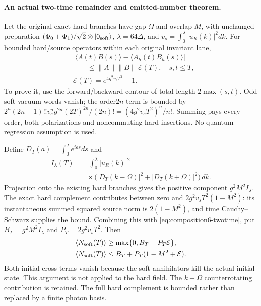 \paragraph{An actual two-time remainder and emitted-number theorem.}
Let the original exact hard branches have gap \(\Omega\) and overlap
\(M\), with unchanged preparation
\((\Phi_0+\Phi_1)/\sqrt2\otimes|0_{\rm soft}\rangle\),
\(\lambda=64\Delta\), and
\(v_s=\int_0^\lambda |u_R(k)|^2dk\).
For bounded hard/source operators within each original invariant lane,
\begin{equation}
 \begin{aligned}
 &|\langle A(t)B(s)\rangle-\langle A_h(t)B_h(s)\rangle|\\
 &\qquad\le\|A\|\|B\|\,\mathcal E(T),\quad s,t\le T,\\
 &\mathcal E(T)=e^{4g^2v_sT^2}-1.
 \end{aligned}
 \label{eq:composition6-twotime}
\end{equation}
To prove it, use the forward/backward contour of total length
\(2\max(s,t)\). Odd soft-vacuum words vanish; the order\(2n\) term is
bounded by \(2^n(2n-1)!!v_s^ng^{2n}(2T)^{2n}/(2n)!
=(4g^2v_sT^2)^n/n!\). Summing pays every order, both polarizations and
noncommuting hard insertions. No quantum regression assumption is used.

Define \(D_T(a)=\int_0^T e^{ias}ds\) and
\begin{equation}
 \begin{aligned}
 I_\lambda(T)&=\int_0^\lambda |u_R(k)|^2\\
 &\quad\times\bigl(|D_T(k-\Omega)|^2+|D_T(k+\Omega)|^2\bigr)\,dk.
 \end{aligned}
\end{equation}
Projection onto the existing hard branches gives the positive component
\(g^2M^2I_\lambda\). The exact hard complement contributes between zero
and \(2g^2v_sT^2(1-M^2)\): its instantaneous summed squared source norm is
\(2(1-M^2)\), and time Cauchy--Schwarz supplies the bound. Combining this
with \eqref{eq:composition6-twotime}, put
\(B_T=g^2M^2I_\lambda\) and \(P_T=2g^2v_sT^2\). Then
\begin{equation}
 \begin{aligned}
 \langle N_{\rm soft}(T)\rangle
   &\ge\max\{0,B_T-P_T\mathcal E\},\\
 \langle N_{\rm soft}(T)\rangle
   &\le B_T+P_T(1-M^2+\mathcal E).
 \end{aligned}
 \label{eq:composition6-emission}
\end{equation}
Both initial cross terms vanish because the soft annihilators kill the
actual initial state. This argument is not applied to the hard field.
The \(k+\Omega\) counterrotating contribution is retained. The full
hard complement is bounded rather than replaced by a finite photon basis.

